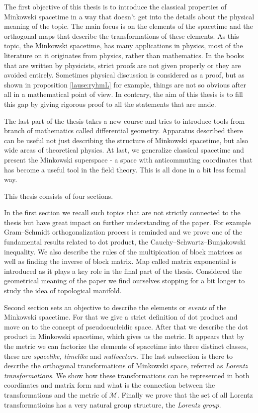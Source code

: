\documentclass[12pt,a4paper,oneside]{article}
\theoremstyle{plain}
\theoremstyle{definition}
\numberwithin{equation}{section}
\def\M{{\mathcal M}}
\begin{document}
The first objective of this thesis is to introduce the 
classical properties of Minkowski spacetime in a way that 
doesn't get into the details about the physical meaning 
of the topic. The main focus is on the elements of the 
spacetime and the orthogonal maps that describe the 
transformations of these elements. As this topic, the 
Minkowski spacetime, has many applications in physics, 
most of the literature on it originates from physics, 
rather than mathematics. In the books that are written 
by physicists, strict proofs are not given properly or 
they are avoided entirely. Sometimes physical discussion 
is considered as a proof, but as shown in proposition 
\ref{lause:ryhmL} for example, things are not so obvious 
after all in a mathematical point of view. In contrary, 
the aim of this thesis is to fill this gap by giving rigorous 
proof to all the statements that are made.

The last part of the thesis takes a new course and tries 
to introduce tools from branch of mathematics called 
differential geometry. Apparatus described there can be 
useful not just describing the structure of Minkowski 
spacetime, but also wide areas of theoretical physics. 
At last, we generalize classical spacetime and present 
the Minkowski superspace - a space with anticommuting 
coordinates that has become a useful tool in the 
field theory. This is all done in a bit less formal way.

This thesis consists of four sections.

In the first section we recall such topics that are not 
strictly connected to the thesis but have great impact 
on further understanding of the paper. For example 
Gram--Schmidt orthogonalization process is reminded and we 
prove one of the fundamental results related to dot 
product, the Cauchy--Schwartz--Bunjakowski inequality. 
We also describe the rules of the multipication of 
block matrices as well as finding the inverse of block 
matrix. Map called matrix exponential is introduced as 
it plays a key role in the final part of the thesis. 
Considered the geometrical meaning of the paper we find 
ourselves stopping for a bit longer to study the idea 
of topological manifold.

Second section sets an objective to describe the elements 
or \emph{events} of the Minkowski spacetime. For that we 
give a strict definition of dot product and move on to 
the concept of pseudoeucleidic space. After that we 
describe the dot product in Minkowski spacetime, which 
gives us the metric. It appears that by the metric we can 
factorize the elements of spacetime into three distinct 
classes, these are \emph{spacelike, timelike} and 
\emph{nullvectors}. The last subsection is there to 
describe the orthogonal transformations of Minkowski space, 
referred as \emph{Lorentz transformations}. We show how these 
transformations can be represented in both coordinates and 
matrix form and what is the connection between the 
transformations and the metric of $\M$. Finally we prove 
that the set of all Lorentz transformatioins has a very 
natural group structure, the \emph{Lorentz group}.
\end{document}
